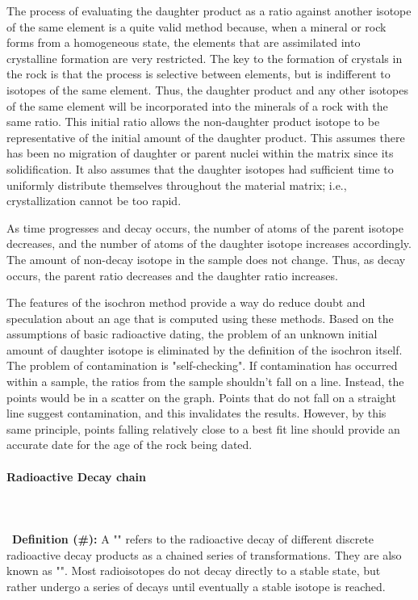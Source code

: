 	The process of evaluating the daughter product as a ratio against another isotope of the same element is a quite valid method because, when a mineral or rock forms from a homogeneous state, the elements that are assimilated into crystalline formation are very restricted. The key to the formation of crystals in the rock is that the process is selective between elements, but is indifferent to isotopes of the same element. Thus, the daughter product and any other isotopes of the same element will be incorporated into the minerals of a rock with the same ratio. This initial ratio allows the non-daughter product isotope to be representative of the initial amount of the daughter product. This assumes there has been no migration of daughter or parent nuclei within the matrix since its solidification. It also assumes that the daughter isotopes had sufficient time to uniformly distribute themselves throughout the material matrix; i.e., crystallization cannot be too rapid. 
	
	As time progresses and decay occurs, the number of atoms of the parent isotope decreases, and the number of atoms of the daughter isotope increases accordingly. The amount of non-decay isotope in the sample does not change. Thus, as decay occurs, the parent ratio decreases and the daughter ratio increases.
	
	The features of the isochron method provide a way do reduce doubt and speculation about an age that is computed using these methods. Based on the assumptions of basic radioactive dating, the problem of an unknown initial amount of daughter isotope is eliminated by the definition of the isochron itself. The problem of contamination is "self-checking". If contamination has occurred within a sample, the ratios from the sample shouldn't fall on a line. Instead, the points would be in a scatter on the graph. Points that do not fall on a straight line suggest contamination, and this invalidates the results. However, by this same principle, points falling relatively close to a best fit line should provide an accurate date for the age of the rock being dated.
	
	\pagebreak
	\paragraph{Radioactive Decay chain}\mbox{}\\\\\
	 \textbf{Definition (\#\mydef):} A "" refers to the radioactive decay of different discrete radioactive decay products as a chained series of transformations. They are also known as "". Most radioisotopes do not decay directly to a stable state, but rather undergo a series of decays until eventually a stable isotope is reached.

